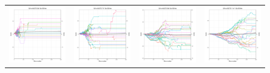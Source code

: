 \begin{figure}
\centering
\begin{tabular}{cccc}
\hspace{-0.5cm}\includegraphics[width = 1.55in]{images/Visualizations/GAvsMCTS/500ms5x5.png} &
\hspace{-0.5cm}\includegraphics[width = 1.55in]{images/Visualizations/GAvsMCTS/500ms7x7.png} &
\hspace{-0.5cm}\includegraphics[width = 1.55in]{images/Visualizations/GAvsMCTS/500ms9x9.png} &
\hspace{-0.5cm}\includegraphics[width = 1.55in]{images/Visualizations/GAvsMCTS/500ms11x11.png} \\


\end{tabular}
\end{figure}

